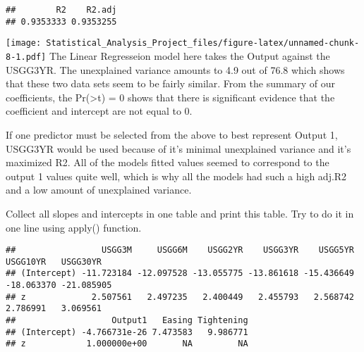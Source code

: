 \documentclass[]{article}
\newenvironment{Shaded}{\begin{snugshade}}{\end{snugshade}}
\newcommand{\KeywordTok}[1]{\textcolor[rgb]{0.13,0.29,0.53}{\textbf{#1}}}
\newcommand{\DataTypeTok}[1]{\textcolor[rgb]{0.13,0.29,0.53}{#1}}
\newcommand{\DecValTok}[1]{\textcolor[rgb]{0.00,0.00,0.81}{#1}}
\newcommand{\StringTok}[1]{\textcolor[rgb]{0.31,0.60,0.02}{#1}}
\newcommand{\ControlFlowTok}[1]{\textcolor[rgb]{0.13,0.29,0.53}{\textbf{#1}}}
\newcommand{\OperatorTok}[1]{\textcolor[rgb]{0.81,0.36,0.00}{\textbf{#1}}}
\newcommand{\NormalTok}[1]{#1}
\begin{document}
\begin{verbatim}
##        R2    R2.adj 
## 0.9353333 0.9353255
\end{verbatim}

\begin{Shaded}
\end{Shaded}

\texttt{[image: Statistical\_Analysis\_Project\_files/figure-latex/unnamed-chunk-8-1.pdf]}
The Linear Regresseion model here takes the Output against the USGG3YR.
The unexplained variance amounts to 4.9 out of 76.8 which shows that
these two data sets seem to be fairly similar. From the summary of our
coefficients, the Pr(\textgreater{}t) = 0 shows that there is
significant evidence that the coefficient and intercept are not equal to
0.

If one predictor must be selected from the above to best represent
Output 1, USGG3YR would be used because of it's minimal unexplained
variance and it's maximized R2. All of the models fitted values seemed
to correspond to the output 1 values quite well, which is why all the
models had such a high adj.R2 and a low amount of unexplained variance.

Collect all slopes and intercepts in one table and print this table. Try
to do it in one line using apply() function.

\begin{Shaded}
\end{Shaded}

\begin{verbatim}
##                 USGG3M     USGG6M    USGG2YR    USGG3YR    USGG5YR   USGG10YR   USGG30YR
## (Intercept) -11.723184 -12.097528 -13.055775 -13.861618 -15.436649 -18.063370 -21.085905
## z             2.507561   2.497235   2.400449   2.455793   2.568742   2.786991   3.069561
##                   Output1   Easing Tightening
## (Intercept) -4.766731e-26 7.473583   9.986771
## z            1.000000e+00       NA         NA
\end{verbatim}
\end{document}
